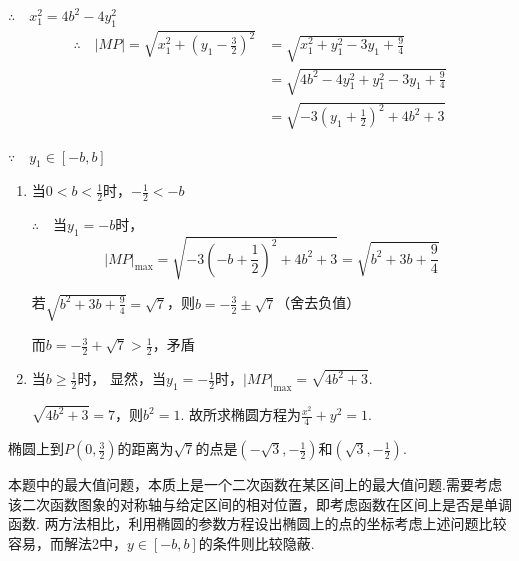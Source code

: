 \begin{solution}
$\therefore\quad x^2_1=4b^2-4y^2_1$
\[\begin{split}
    \therefore\quad |MP|=\sqrt{x^2_1+\left(y_1-\frac{3}{2}\right)^2}&=\sqrt{x^2_1+y^2_1-3y_1+\frac{9}{4}}\\
    &=\sqrt{4b^2-4y^2_1+y^2_1-3y_1+\frac{9}{4}}\\
    &=\sqrt{-3\left(y_1+\frac{1}{2}\right)^2+4b^2+3}
\end{split}\]

$\because\quad y_1\in [-b,b]$

\begin{enumerate}[(1)]
    \item 当$0<b<\frac{1}{2}$时，$-\frac{1}{2}<-b$
    
    $\therefore\quad $当$y_1=-b$时，
\[|MP|_{\max}=\sqrt{-3\left(-b+\frac{1}{2}\right)^2+4b^2+3}=\sqrt{b^2+3b+\frac{9}{4}}\]

若$\sqrt{b^2+3b+\frac{9}{4}}=\sqrt{7}$，则$b=-\frac{3}{2}\pm\sqrt{7}$（舍去负值）

而$b=-\frac{3}{2}+\sqrt{7}>\frac{1}{2}$，矛盾

\item 当$b\ge \frac{1}{2}$时，
显然，当$y_1=-\frac{1}{2}$时，$|MP|_{\max}=\sqrt{4b^2+3}$.

$\sqrt{4b^2+3}=7$，则$b^2=1$.
故所求椭圆方程为$\frac{x^2}{4}+y^2=1$.
\end{enumerate}

椭圆上到$P\left(0,\frac{3}{2}\right)$的距离为$\sqrt{7}$的点是$\left(-\sqrt{3},-\frac{1}{2}\right)$和$\left(\sqrt{3},-\frac{1}{2}\right)$.
\end{solution}


\begin{remark}
    本题中的最大值问题，本质上是一个二次函数在某区间上的最大值问题.需要考虑该二次函数图象的对称轴与给定区间的相对位置，即考虑函数在区间上是否是单调函数. 两方法相比，利用椭圆的参数方程设出椭圆上的点的坐标考虑上述问题比较容易，而解法2中，$y\in [-b,b]$的条件则比较隐蔽.
\end{remark}

